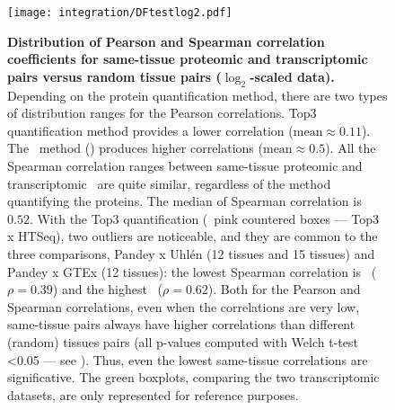 \begin{figure}[!htbp]
    \texttt{[image: integration/DFtestlog2.pdf]}\centering
    \vspace{-4mm}
    \caption[Distribution of Pearson and Spearman correlation coefficients
    for same-tissue proteomic and transcriptomic pairs
    versus random tissue pairs]{\label{fig:TestSig}\textbf{Distribution of
    Pearson and Spearman correlation coefficients
    for same-tissue proteomic and transcriptomic pairs versus random tissue
    pairs ($\log_2$-scaled data).} Depending on the protein quantification method,
    there are two types of distribution ranges for the Pearson correlations.
    Top3 quantification method provides a lower correlation ($\text{mean} \approx 0.11$).
    The \PPKM\ method () produces higher correlations
    ($\text{mean} \approx 0.5$).
    All the Spearman correlation ranges between same-tissue proteomic and
    transcriptomic \treps\ are quite similar,
    regardless of the method quantifying the proteins.
    The median of Spearman correlation is $0.52$.
    With the Top3 quantification (\ie\ pink countered boxes --- Top3 x HTSeq),
    two outliers are noticeable, and they are common to the three comparisons,
    Pandey x Uhlén (12 tissues and 15 tissues) and Pandey x GTEx (12 tissues):
    the lowest Spearman correlation is \Oesophagus\ ($\rho=0.39$)
    and the highest \liver\ ($\rho=0.62$).
    Both for the Pearson and Spearman correlations,
    even when the correlations are very low,
    same-tissue pairs always have higher correlations than
    different (random) tissues pairs
    (all p-values computed with Welch t-test <0.05 --- see ).
    Thus, even the lowest same-tissue correlations are significative.
    The green boxplots, comparing the two transcriptomic datasets,
    are only represented for reference purposes.}
\end{figure}


